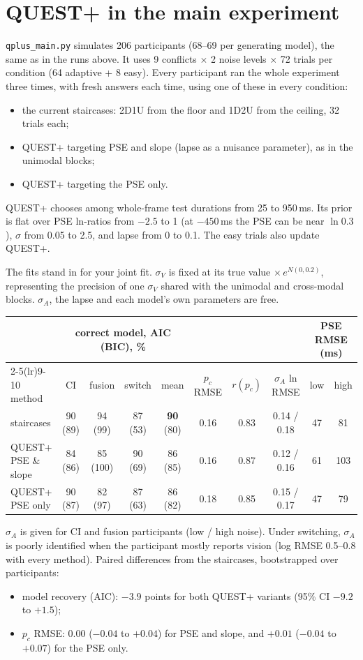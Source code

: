 \documentclass[11pt,a4paper]{article}
\begin{document}
\section{QUEST+ in the main experiment}\label{sec:qplus}
\texttt{qplus\_main.py} simulates 206 participants (68--69 per generating model), the same as in the runs above. It uses 9 conflicts $\times$ 2 noise levels $\times$ 72 trials per condition (64 adaptive + 8 easy). Every participant ran the whole experiment three times, with fresh answers each time, using one of these in every condition:
\begin{itemize}
\item the current staircases: 2D1U from the floor and 1D2U from the ceiling, 32 trials each;
\item QUEST+ targeting PSE and slope (lapse as a nuisance parameter), as in the unimodal blocks;
\item QUEST+ targeting the PSE only.
\end{itemize}
QUEST+ chooses among whole-frame test durations from 25 to 950\,ms. Its prior is flat over PSE ln-ratios from $-2.5$ to 1 (at $-450$\,ms the PSE can be near $\ln 0.3$), $\sigma$ from 0.05 to 2.5, and lapse from 0 to 0.1. The easy trials also update QUEST+.

The fits stand in for your joint fit. $\sigma_V$ is fixed at its true value $\times\, e^{N(0, 0.2)}$, representing the precision of one $\sigma_V$ shared with the unimodal and cross-modal blocks. $\sigma_A$, the lapse and each model's own parameters are free.

\begin{center}\footnotesize\setlength{\tabcolsep}{3.5pt}
\begin{tabular}{lccccccccc}
\toprule
& \multicolumn{4}{c}{correct model, AIC (BIC), \%} & & & & \multicolumn{2}{c}{PSE RMSE (ms)} \\
\cmidrule(lr){2-5}\cmidrule(lr){9-10}
method & CI & fusion & switch & mean & $p_c$ RMSE & $r(p_c)$ & $\sigma_A$ ln RMSE & low & high \\
\midrule
staircases & 90 (89) & 94 (99) & 87 (53) & \textbf{90} (80) & 0.16 & 0.83 & 0.14 / 0.18 & 47 & 81 \\
QUEST+ PSE \& slope & 84 (86) & 85 (100) & 90 (69) & 86 (85) & 0.16 & 0.87 & 0.12 / 0.16 & 61 & 103 \\
QUEST+ PSE only & 90 (87) & 82 (97) & 87 (63) & 86 (82) & 0.18 & 0.85 & 0.15 / 0.17 & 47 & 79 \\
\bottomrule
\end{tabular}
\end{center}
$\sigma_A$ is given for CI and fusion participants (low / high noise). Under switching, $\sigma_A$ is poorly identified when the participant mostly reports vision (log RMSE 0.5--0.8 with every method). Paired differences from the staircases, bootstrapped over participants:
\begin{itemize}
\item model recovery (AIC): $-3.9$ points for both QUEST+ variants (95\% CI $-9.2$ to $+1.5$);
\item $p_c$ RMSE: $0.00$ ($-0.04$ to $+0.04$) for PSE and slope, and $+0.01$ ($-0.04$ to $+0.07$) for the PSE only.
\end{itemize}
\end{document}
